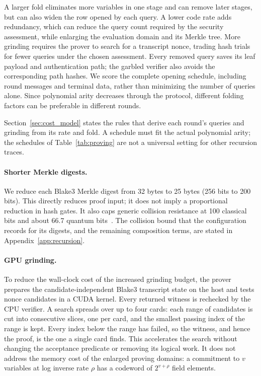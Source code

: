 \documentclass[11pt]{article}
\begin{document}
A larger fold eliminates more variables in one stage and can remove later
stages, but can also widen the row opened by each query. A lower code rate
adds redundancy, which can reduce the query count required by the security
assessment, while enlarging the evaluation domain and its Merkle tree.
More grinding requires the prover to search for a transcript nonce, trading
hash trials for fewer queries under the chosen assessment. Every removed
query saves its leaf payload and authentication path; the garbled verifier
also avoids the corresponding path hashes. We score the complete opening
schedule, including round messages and terminal data, rather than minimizing
the number of queries alone. Since polynomial arity decreases through the
protocol, different folding factors can be preferable in different rounds.

Section~\ref{sec:cost_model} states the rules that derive each round's
queries and grinding from its rate and fold. A schedule must fit the actual
polynomial arity; the schedules of Table~\ref{tab:proving} are not a
universal setting for other recursion traces.

\paragraph{Shorter Merkle digests.} We reduce each Blake3 Merkle digest
from 32 bytes to 25 bytes (256 bits to 200 bits). This directly
reduces proof input; it does not imply a proportional reduction in hash
gates. It also caps generic collision resistance at 100 classical bits and
about 66.7 quantum bits~\cite{bht98}. The collision bound that the configuration records for its digests, and the remaining composition terms, are stated in Appendix~\ref{app:recursion}.

\paragraph{GPU grinding.} To reduce the wall-clock cost of the increased
grinding budget, the prover prepares the candidate-independent Blake3
transcript state on the host and tests nonce candidates in a CUDA kernel.
Every returned witness is rechecked by the CPU verifier. A search spreads
over up to four cards: each range of candidates is cut into consecutive
slices, one per card, and the smallest passing index of the range is kept.
Every index below the range has failed, so the witness, and hence the proof,
is the one a single card finds. This accelerates the search without changing
the acceptance predicate or removing its logical work. It does not address
the memory cost of the enlarged proving domains: a commitment to $v$
variables at log inverse rate $\rho$ has a codeword of $2^{v+\rho}$ field
elements.
\end{document}
